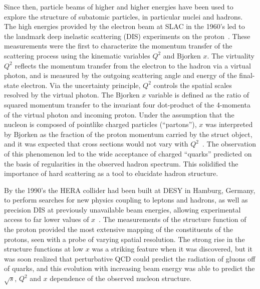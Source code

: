 Since then, particle beams of higher and higher energies have been used
to explore the structure of subatomic particles, in particular nuclei and hadrons.
The high energies provided by the electron beam at SLAC in the 1960's led to the
landmark deep inelastic scattering (DIS) experiments on the proton~\cite{Breidenbach:1969kd}.
These measurements were the first to characterize the momentum transfer of the scattering
process using the kinematic variables $Q^2$ and Bjorken $x$.  The virtuality $Q^2$ reflects
the momentum transfer from the electron to the hadron via a virtual photon, and is measured
by the outgoing scattering angle and energy of the final-state electron.
Via the uncertainty principle, $Q^2$ controls the spatial scales resolved by the virtual photon.
The Bjorken $x$ variable is defined as the ratio of squared momentum transfer to the 
invariant four dot-product of the 4-momenta of the virtual photon and incoming proton.
Under the assumption that the nucleon is composed of pointlike charged particles (``partons''),
$x$ was interpreted by Bjorken as the fraction of the proton momentum carried by the 
struct object, and it was expected that cross sections would not vary with $Q^2$~\cite{PhysRev.179.1547}.
The observation of this phenomenon led to the wide acceptance of
charged ``quarks'' predicted on the basis of regularities in the observed hadron spectrum.
This solidified the importance of hard scattering as a tool to elucidate hadron structure.

By the 1990's the HERA collider had been built at DESY in Hamburg, Germany, to perform 
searches for new physics coupling to leptons and hadrons, as well as precision DIS 
at previously unavailable beam energies, allowing experimental access to far lower
values of $x$~\cite{Aid:1995rk}.  
The measurements of the structure function of the proton provided
the most extensive mapping of the constituents of the protons, seen with a probe 
of varying spatial resolution.  The strong rise in the structure functions at low $x$
was a striking feature when it was discovered, but it was soon realized that perturbative
QCD could predict the radiation of gluons off of quarks, and this evolution with
increasing beam energy was able to predict the $\sqrt{s}$, $Q^2$ and $x$ dependence
of the observed nucleon structure.

